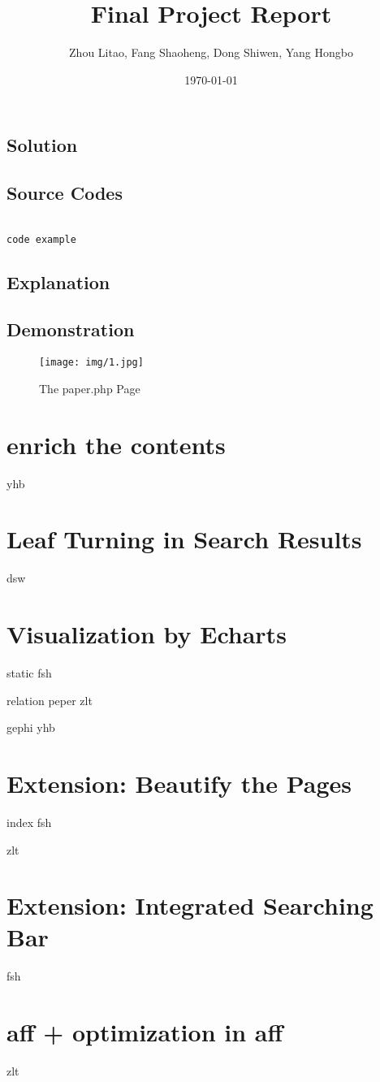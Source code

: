 \documentclass{article}
\begin{document}
\title{Final Project Report}
\author{Zhou Litao, Fang Shaoheng, Dong Shiwen, Yang Hongbo}
\date{\today}


\maketitle
\tableofcontents



\subsection{Solution}

\subsection{Source Codes}

\begin{minipage}[r]{15em}
\begin{verbatim}

code example

\end{verbatim}
\end{minipage}

\subsection{Explanation}

\subsection{Demonstration}

\begin{figure}[H]
\centering
\texttt{[image: img/1.jpg]}
\caption{The paper.php Page}
\end{figure}


\section {enrich the contents}
yhb


\section{Leaf Turning in Search Results}
dsw

\section {Visualization by Echarts}
static fsh

relation peper zlt

gephi yhb

\section {Extension: Beautify the Pages}
index fsh

zlt

\section {Extension: Integrated Searching Bar}
fsh

\section {aff + optimization in aff}
zlt
\end{document}
